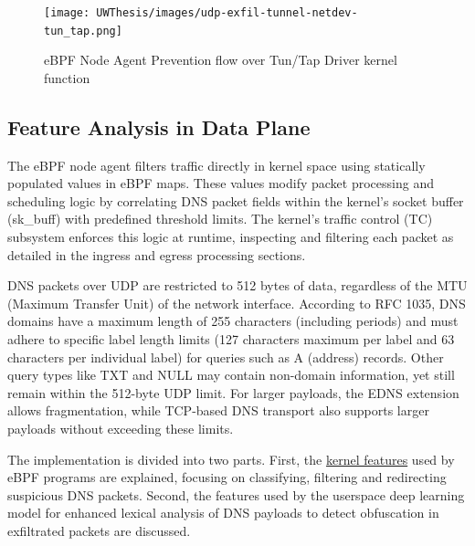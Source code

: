 \documentclass [11pt, proquest] {uwthesis}[2020/02/24]
\begin{document}
\begin{figure}[H]
\texttt{[image: UWThesis/images/udp-exfil-tunnel-netdev-tun\_tap.png]}
\caption{eBPF Node Agent Prevention flow over Tun/Tap Driver kernel function}
\label{sec:data_plane_tunnel_netdev}
\end{figure}



\subsection{Feature Analysis in Data Plane}
\label{sec:features}
The eBPF node agent filters traffic directly in kernel space using statically populated values in eBPF maps. These values modify packet processing and scheduling logic by correlating DNS packet fields within the kernel’s socket buffer (sk\_buff) with predefined threshold limits. The kernel’s traffic control (TC) subsystem enforces this logic at runtime, inspecting and filtering each packet as detailed in the ingress and egress processing sections.

DNS packets over UDP are restricted to 512 bytes of data, regardless of the MTU (Maximum Transfer Unit) of the network interface. According to RFC 1035, DNS domains have a maximum length of 255 characters (including periods) and must adhere to specific label length limits (127 characters maximum per label and 63 characters per individual label) for queries such as A (address) records. Other query types like TXT and NULL may contain non-domain information, yet still remain within the 512-byte UDP limit. For larger payloads, the EDNS extension allows fragmentation, while TCP-based DNS transport also supports larger payloads without exceeding these limits.

The implementation is divided into two parts. First, the  \hyperref[sec:kernel-features]{kernel features} used by eBPF programs are explained, focusing on classifying, filtering and redirecting suspicious DNS packets. Second, the features used by the userspace deep learning model for enhanced lexical analysis of DNS payloads to detect obfuscation in exfiltrated packets are discussed.
\end{document}
